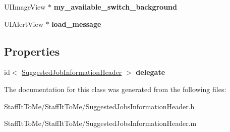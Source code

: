 \begin{DoxyCompactItemize}
\item 
\hypertarget{interface_suggested_jobs_information_header_a57ace986ccf9ff3cfc37c1664973f653}{
\-U\-I\-Image\-View $\ast$ {\bfseries my\-\_\-available\-\_\-switch\-\_\-background}}
\label{interface_suggested_jobs_information_header_a57ace986ccf9ff3cfc37c1664973f653}

\item 
\hypertarget{interface_suggested_jobs_information_header_a61e40d582370ceb159511371293760ae}{
\-U\-I\-Alert\-View $\ast$ {\bfseries load\-\_\-message}}
\label{interface_suggested_jobs_information_header_a61e40d582370ceb159511371293760ae}

\end{DoxyCompactItemize}
\subsection*{\-Properties}
\begin{DoxyCompactItemize}
\item 
\hypertarget{interface_suggested_jobs_information_header_aa50454d5f0064733862b2c2cb189cb0c}{
id$<$ \hyperlink{protocol_suggested_job_information_header-p}{\-Suggested\-Job\-Information\-Header} $>$ {\bfseries delegate}}
\label{interface_suggested_jobs_information_header_aa50454d5f0064733862b2c2cb189cb0c}

\end{DoxyCompactItemize}


\-The documentation for this class was generated from the following files\-:\begin{DoxyCompactItemize}
\item 
\-Staff\-It\-To\-Me/\-Staff\-It\-To\-Me/\-Suggested\-Jobs\-Information\-Header.\-h\item 
\-Staff\-It\-To\-Me/\-Staff\-It\-To\-Me/\-Suggested\-Jobs\-Information\-Header.\-m\end{DoxyCompactItemize}
